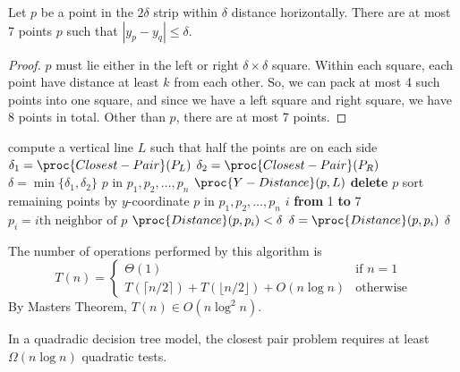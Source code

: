 \vspace{\parskip}

\begin{lemma}
    Let $p$ be a point in the $2\delta$ strip within $\delta$ distance horizontally. There are at most 7 points $p$ such that $|y_p-y_q| \leq \delta$.
\end{lemma}

\begin{proof}
    $p$ must lie either in the left or right $\delta \times \delta$ square. Within each square, each point have distance at least $k$ from each other. So, we can pack at most 4 such points into one square, and since we have a left square and right square, we have 8 points in total. Other than $p$, there are at most 7 points.
\end{proof}

\begin{codebox}
    \li compute a vertical line $L$ such that half the points 
    \zi are on each side 
    \zi {}
    \li $\delta_1 = \proc{Closest-Pair}(P_L)$
    \li $\delta_2 = \proc{Closest-Pair}(P_R)$
    \li $\delta = \min \{ \delta_1,\delta_2 \}$
    \li \For $p$ in $p_1,p_2,\ldots,p_n$ \Do {}
        \li \If $\proc{Y-Distance}(p,L)$ \Then
            \li \textbf{delete} $p$
        \End
    \End
    \li sort remaining points by $y$-coordinate 
    \li \For $p$ in $p_1,p_2,\ldots,p_n$ \Do {}
        \li \For $i$ \textbf{from} 1 \textbf{to} 7 \Do
            \li $p_i = \text{$i$th neighbor of $p$}$
            \li \If $\proc{Distance}(p,p_i) < \delta$ \Then
                \li $\delta = \proc{Distance}(p,p_i)$
            \End
        \End
    \End
    \li \Return $\delta$ 
\end{codebox}

The number of operations performed by this algorithm is
$$
T(n) =
\begin{cases}
    \Theta(1) & \text{if $n = 1$} \\
    T(\lceil n/2 \rceil) + T(\lfloor n/2 \rfloor) + O(n\log n) & \text{otherwise}
\end{cases}
$$
By Masters Theorem, $T(n) \in O(n \log^2 n)$.

\begin{theorem}
    In a quadradic decision tree model, the closest pair problem requires at least $\Omega(n \log n)$ quadratic tests.
\end{theorem}

